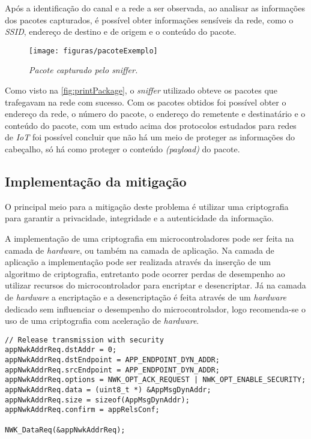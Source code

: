 \par Ap\'os a identifica\c{c}\~ao do canal e a rede a ser observada, ao analisar as informa\c{c}\~oes dos pacotes capturados, \'e poss\'ivel obter informa\c{c}\~oes sens\'iveis da rede, como o \emph{SSID}, endere\c{c}o de destino e de origem e o conte\'udo do pacote.

\begin{figure}[ht]
	\centering
	\caption{\emph{Pacote capturado pelo \emph{sniffer}.}}
	\texttt{[image: figuras/pacoteExemplo]}
    \label{fig:printPackage}
\end{figure}

\par Como visto na \autoref{fig:printPackage}, o \emph{sniffer} utilizado obteve os pacotes que trafegavam na rede com sucesso. Com os pacotes obtidos foi possível obter o endereço da rede, o número do pacote, o endereço do remetente e destinatário e o conteúdo do pacote, com um estudo acima dos protocolos estudados para redes de \emph{IoT} foi poss\'ivel concluir que n\~ao h\'a um meio de proteger as informa\c{c}\~oes do cabe\c{c}alho, s\'o h\'a como proteger o conte\'udo \emph{(payload)} do pacote.

\subsection{Implementação da mitigação}
\par O principal meio para a mitiga\c{c}\~ao deste problema \'e utilizar uma criptografia para garantir a privacidade, integridade e a autenticidade da informa\c{c}\~ao.

\par A implementa\c{c}\~ao de uma criptografia em microcontroladores pode ser feita na camada de \emph{hardware}, ou tamb\'em na camada de aplica\c{c}\~ao. Na camada de aplica\c{c}\~ao a implementa\c{c}\~ao pode ser realizada atrav\'es da inser\c{c}\~ao de um algoritmo de criptografia, entretanto pode ocorrer perdas de desempenho ao utilizar recursos do microcontrolador para encriptar e desencriptar. J\'a na camada de \emph{hardware} a encripta\c{c}\~ao e a desencripta\c{c}\~ao \'e feita atrav\'es de um \emph{hardware} dedicado sem influenciar o desempenho do microcontrolador, logo recomenda-se o uso de uma criptografia com acelera\c{c}\~ao de \emph{hardware}.

\begin{lstlisting}[label={lst:packet}]
// Release transmission with security
appNwkAddrReq.dstAddr = 0;
appNwkAddrReq.dstEndpoint = APP_ENDPOINT_DYN_ADDR;
appNwkAddrReq.srcEndpoint = APP_ENDPOINT_DYN_ADDR;
appNwkAddrReq.options = NWK_OPT_ACK_REQUEST | NWK_OPT_ENABLE_SECURITY;
appNwkAddrReq.data = (uint8_t *) &AppMsgDynAddr;
appNwkAddrReq.size = sizeof(AppMsgDynAddr);
appNwkAddrReq.confirm = appRelsConf;

NWK_DataReq(&appNwkAddrReq);
\end{lstlisting}

